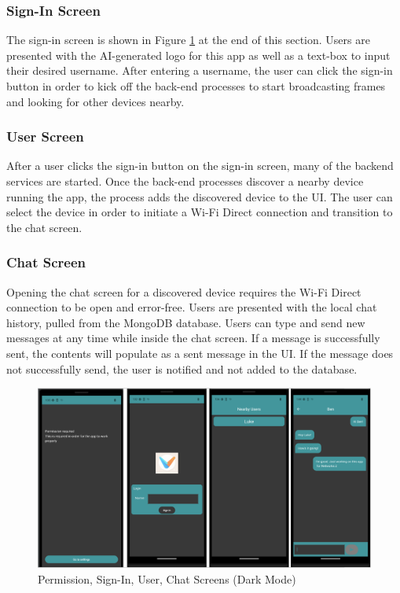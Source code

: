 \documentclass[10pt]{article}
\begin{document}
\subsubsection{Sign-In Screen}
The sign-in screen is shown in Figure \ref{frontend:screens} at the end of this section. Users are presented with the AI-generated logo for this app as well as a text-box to input their desired username. After entering a username, the user can click the sign-in button in order to kick off the back-end processes to start broadcasting frames and looking for other devices nearby.
\subsubsection{User Screen}

After a user clicks the sign-in button on the sign-in screen, many of the backend services are started. Once the back-end processes discover a nearby device running the app, the process adds the discovered device to the UI. The user can select the device in order to initiate a Wi-Fi Direct connection and transition to the chat screen.

\subsubsection{Chat Screen}
Opening the chat screen for a discovered device requires the Wi-Fi Direct connection to be open and error-free. Users are presented with the local chat history, pulled from the MongoDB database. Users can type and send new messages at any time while inside the chat screen. If a message is successfully sent, the contents will populate as a sent message in the UI. If the message does not successfully send, the user is notified and not added to the database.

\begin{figure}[h]
    \centering
    \includegraphics[width=6.5in]{screens.png}
    \caption{Permission, Sign-In, User, Chat Screens (Dark Mode)}
    \label{frontend:screens}
\end{figure}
\end{document}
